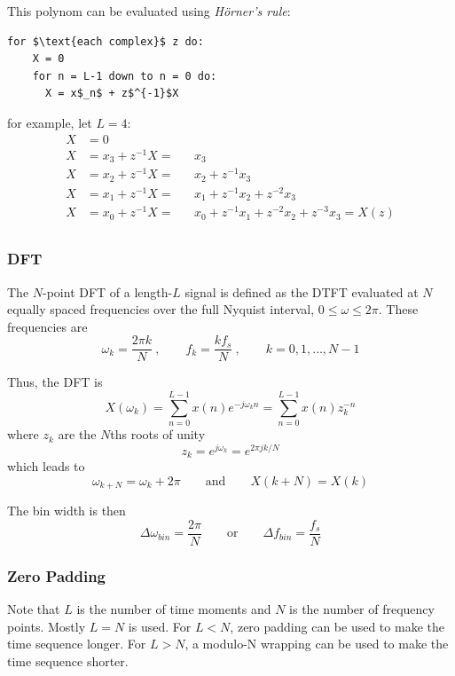 This polynom can be evaluated using \emph{Hörner's rule}:
\begin{lstlisting}[mathescape]
for $\text{each complex}$ z do:
	X = 0
	for n = L-1 down to n = 0 do:
	  X = x$_n$ + z$^{-1}$X
\end{lstlisting}
for example, let $L=4$:
\begin{align*}
	X &= 0 \\
	X &= x_3+z^{-1}X = && x_3 \\
	X &= x_2+z^{-1}X = && x_2+z^{-1}x_3 \\
	X &= x_1+z^{-1}X = && x_1+z^{-1}x_2+z^{-2}x_3 \\
	X &= x_0+z^{-1}X = && x_0+z^{-1}x_1+z^{-2}x_2+z^{-3}x_3 = X(z) \\
\end{align*}

\subsubsection{DFT}
The $N$-point DFT of a length-$L$ signal is defined as the DTFT evaluated
at $N$ equally spaced frequencies over the full Nyquist interval,
$0 \leq \omega \leq 2 \pi$. These frequencies are
\begin{equation*}
	\omega_k = \frac{2 \pi k}{N}\:, \qquad f_k = \frac{k f_s}{N} \:,\qquad k=0,1,\ldots,N-1
\end{equation*}

Thus, the DFT is
\begin{equation*}
	X(\omega_k) = \sum\limits_{n=0}^{L-1} x(n) e^{-j\omega_kn} = \sum\limits_{n=0}^{L-1} x(n)z_k^{-n}
\end{equation*}
where $z_k$ are the $N$ths roots of unity
\begin{equation*}
	z_k = e^{j\omega_k} = e^{2\pi j k / N}
\end{equation*}
which leads to
\begin{equation*}
	\omega_{k+N} = \omega_k + 2 \pi \qquad \text{and} \qquad X(k+N) = X(k)
\end{equation*}

The bin width is then
\begin{equation*}
	\Delta\omega_{bin}=\frac{2\pi}{N} \qquad \text{or} \qquad \Delta f_{bin}=\frac{f_s}{N}
\end{equation*}


\subsubsection{Zero Padding}
Note that $L$ is the number of time moments and $N$ is the number of
frequency points. Mostly $L=N$ is used. For $L<N$, zero padding can be used
to make the time sequence longer. For $L>N$, a modulo-N wrapping can be
used to make the time sequence shorter. \\

